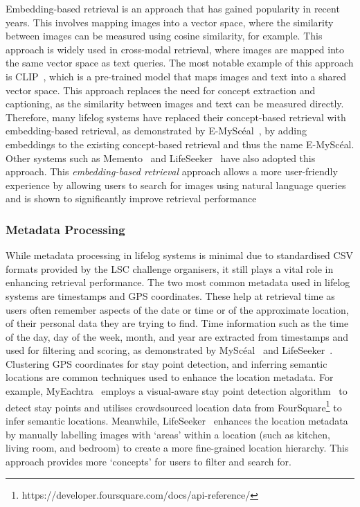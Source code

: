 \documentclass[11pt]{article}
\newcommand{\mysceal}{MySc{\'e}al}
\begin{document}
Embedding-based retrieval is an approach that has gained popularity in recent years. This involves mapping images into a vector space, where the similarity between images can be measured using cosine similarity, for example. This approach is widely used in cross-modal retrieval, where images are mapped into the same vector space as text queries. The most notable example of this approach is CLIP~\cite{radford2021learning}, which is a pre-trained model that maps images and text into a shared vector space. This approach replaces the need for concept extraction and captioning, as the similarity between images and text can be measured directly. Therefore, many lifelog systems have replaced their concept-based retrieval with embedding-based retrieval, as demonstrated by E-\mysceal~\cite{emysceal2022}, by adding embeddings to the existing concept-based retrieval and thus the name E-\mysceal. Other systems such as Memento~\cite{alam2023memento} and LifeSeeker~\cite{nguyen2023lifeseeker} have also adopted this approach. This \textit{embedding-based retrieval} approach allows a more user-friendly experience by allowing users to search for images using natural language queries and is shown to significantly improve  retrieval performance 

\subsubsection{Metadata Processing}
While metadata processing in lifelog systems is minimal due to standardised CSV formats provided by the LSC challenge organisers, it still plays a vital role in enhancing retrieval performance. The two most common metadata used in lifelog systems are timestamps and GPS coordinates. These help at retrieval time as users often remember aspects of the date or time or of the approximate location, of their personal data they are trying to find. Time information such as the time of the day, day of the week, month, and year are extracted from timestamps and used for filtering and scoring, as demonstrated by \mysceal~\cite{emysceal2022} and LifeSeeker~\cite{nguyen2023lifeseeker}. Clustering GPS coordinates for stay point detection, and inferring semantic locations are common techniques used to enhance the location metadata. For example, MyEachtra~\cite{tran2023myeachtra} employs a visual-aware stay point detection algorithm~\cite{tran2023vaisl} to detect stay points and utilises crowdsourced location data from FourSquare\footnote{https://developer.foursquare.com/docs/api-reference/} to infer semantic locations. Meanwhile, LifeSeeker~\cite{nguyen2023lifeseeker} enhances the location metadata by manually labelling images with `areas' within a location (such as kitchen, living room, and bedroom) to create a more fine-grained location hierarchy. This approach provides more `concepts' for users to filter and search for.
\end{document}
